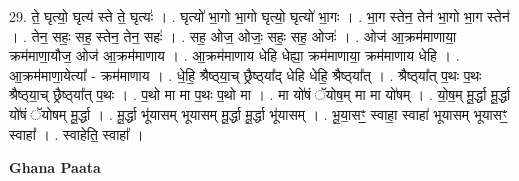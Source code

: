 \documentclass[17pt]{extarticle}
\begin{document}
29. ते॒ घृत्यो॒ घृत्य॑ स्ते ते॒ घृत्यः॑ । . घृत्यो॑ भा॒गो भा॒गो घृत्यो॒ घृत्यो॑ भा॒गः । . भा॒ग स्तेन॒ तेन॑ भा॒गो भा॒ग स्तेन॑ । . तेन॒ सहः॒ सह॒ स्तेन॒ तेन॒ सहः॑ । . सह॒ ओज॒ ओजः॒ सहः॒ सह॒ ओजः॑ । . ओज॑ आ॒क्रम॑माणाया॒ क्रम॑माणा॒यौज॒ ओज॑ आ॒क्रम॑माणाय । . आ॒क्रम॑माणाय धेहि धेह्या॒ क्रम॑माणाया॒ क्रम॑माणाय धेहि । . आ॒क्रम॑माणा॒येत्या᳚ - क्रम॑माणाय । . धे॒हि॒ श्रैष्ठ्‍या॒च् छ्रैष्ठ्‍या᳚द् धेहि धेहि॒ श्रैष्ठ्‍या᳚त् । . श्रैष्ठ्‍या᳚त् प॒थः प॒थः श्रैष्ठ्‍या॒च् छ्रैष्ठ्‍या᳚त् प॒थः । . प॒थो मा मा प॒थः प॒थो मा । . मा यो॑षं ॅयोष॒म् मा मा यो॑षम् । . यो॒ष॒म् मू॒र्द्धा मू॒र्द्धा यो॑षं ॅयोषम् मू॒र्द्धा । . मू॒र्द्धा भू॑यासम् भूयासम् मू॒र्द्धा मू॒र्द्धा भू॑यासम् । . भू॒या॒सꣳ॒॒ स्वाहा॒ स्वाहा॑ भूयासम् भूयासꣳ॒॒ स्वाहा᳚ । . स्वाहेति॒ स्वाहा᳚ । \newline

\textbf{Ghana Paata } \newline
\end{document}
